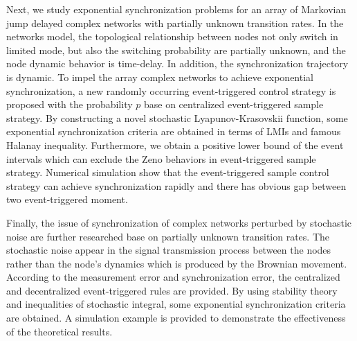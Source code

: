 \begin{englishabstract}
Next, we study exponential synchronization problems for an array of Markovian jump delayed complex networks with partially unknown transition rates. In the networks model, the topological relationship between nodes not only switch in limited mode, but also the switching probability are partially unknown, and the node dynamic behavior is time-delay. In addition, the synchronization trajectory is dynamic. To impel the array complex networks to achieve exponential synchronization, a new randomly occurring event-triggered control strategy is proposed with the probability $p$ base on centralized event-triggered sample strategy. By constructing a novel stochastic Lyapunov-Krasovskii function, some exponential synchronization criteria are obtained in terms of LMIs and famous Halanay inequality. Furthermore, we obtain a positive lower bound of the event intervals which can exclude the Zeno behaviors in event-triggered sample strategy. Numerical simulation show that the  event-triggered sample control strategy can achieve synchronization rapidly and there has obvious gap between two event-triggered moment.

Finally, the issue of synchronization of complex networks perturbed by stochastic noise are further researched base on partially unknown transition rates. The stochastic noise appear in the signal transmission process between the nodes rather than the node's dynamics which is produced by the Brownian movement. According to the measurement error and synchronization error, the centralized and decentralized event-triggered rules are provided. By using stability theory and inequalities of stochastic integral, some exponential synchronization criteria are obtained. A simulation example is provided to demonstrate the effectiveness of the theoretical results.
\vspace{2ex}

\end{englishabstract}
